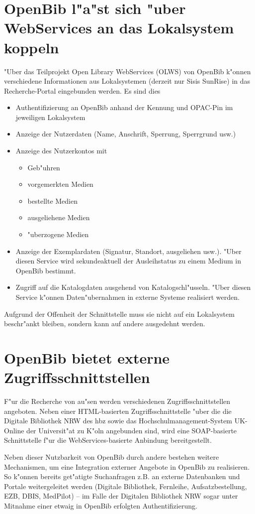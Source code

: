 \documentclass[11pt, twoside, a4paper, BCOR8mm, DIV12, bibtotoc,idxtotoc]{scrbook}
\begin{document}
\section{OpenBib l"a"st sich "uber WebServices an das Lokalsystem koppeln}
"Uber das Teilprojekt Open Library WebServices (OLWS) von OpenBib
k"onnen verschiedene Informationen aus Lokalsystemen (derzeit nur
Sisis SunRise) in das Recherche-Portal eingebunden werden. Es sind
dies
\begin{itemize}
\item Authentifizierung an OpenBib anhand der Kennung und OPAC-Pin im
  jeweiligen Lokalsystem
\item Anzeige der Nutzerdaten (Name, Anschrift, Sperrung, Sperrgrund usw.)
\item Anzeige des Nutzerkontos mit
  \begin{itemize}
  \item Geb"uhren
  \item vorgemerkten Medien
  \item bestellte Medien
  \item ausgeliehene Medien
  \item "uberzogene Medien
  \end{itemize}
\item Anzeige der Exemplardaten (Signatur, Standort, ausgeliehen
  usw.). "Uber diesen Service wird sekundeaktuell der Ausleihstatus zu
  einem Medium in OpenBib bestimmt.
\item Zugriff auf die Katalogdaten ausgehend von
  Katalogschl"usseln. "Uber diesen Service k"onnen Daten"ubernahmen in
  externe Systeme realisiert werden.
\end{itemize}

Aufgrund der Offenheit der Schnittstelle muss sie nicht auf ein
Lokalsystem beschr"ankt bleiben, sondern kann auf andere ausgedehnt
werden.
\section{OpenBib bietet externe Zugriffsschnittstellen}
F"ur die Recherche von au"sen werden verschiedenen
Zugriffsschnittstellen angeboten. Neben einer HTML-basierten
Zugriffsschnittstelle "uber die die Digitale Bibliothek NRW des hbz
sowie das Hochschulmanagement-System UK-Online der Universit"at zu
K"oln angebunden sind, wird eine SOAP-basierte Schnittstelle f"ur die
WebServices-basierte Anbindung bereitgestellt.

Neben dieser Nutzbarkeit von OpenBib durch andere bestehen weitere
Mechanismen, um eine Integration externer Angebote in OpenBib zu
realisieren. So k"onnen bereits get"atigte Suchanfragen z.B. an
externe Datenbanken und Portale weitergeleitet werden (Digitale
Bibliothek, Fernleihe, Aufsatzbestellung, EZB, DBIS, MedPilot) -- im
Falle der Digitalen Bibliothek NRW sogar unter Mitnahme einer etwaig
in OpenBib erfolgten Authentifizierung.
\end{document}
